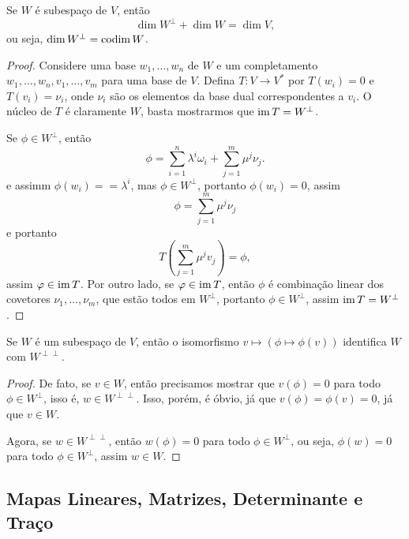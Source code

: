 \begin{proposition}
    Se $W$ é subespaço de $V$, então \begin{equation}
        \dim W^\perp + \dim W = \dim V,
    \end{equation} ou seja, $\dim W^\perp = \operatorname{codim} W$.
\end{proposition}
\begin{proof}
    Considere uma base $w_1, \dots, w_n$ de $W$ e um completamento $w_1, \dots, w_n, v_1, \dots, v_m$ para uma base de $V$. Defina $T \colon V \to V^*$ por $T(w_i) = 0$ e $T(v_i) = \nu_i$, onde $\nu_i$ são os elementos da base dual correspondentes a $v_i$. O núcleo de $T$ é claramente $W$, basta mostrarmos que $\operatorname{im} T = W^\perp$.

    Se $\phi \in W^\perp$, então \begin{equation}
        \phi = \sum_{i = 1}^n \lambda^i \omega_i + \sum_{j = 1}^m \mu^j \nu_j.
    \end{equation} e assimm $\phi(w_i) == \lambda^i$, mas $\phi \in W^\perp$, portanto $\phi(w_i) = 0$, assim \begin{equation}
        \phi = \sum_{j = 1}^m \mu^j \nu_j
    \end{equation} e portanto \begin{equation}
        T\left(\sum_{j = 1}^m \mu^j v_j\right) = \phi,
    \end{equation} assim $\varphi \in \operatorname{im} T$. Por outro lado, se $\varphi \in \operatorname{im} T$, então $\phi$ é combinação linear dos covetores $\nu_1, \dots, \nu_m$, que estão todos em $W^\perp$, portanto $\phi \in W^\perp$, assim $\operatorname{im} T = W^\perp$.
\end{proof}

\begin{proposition}
    Se $W$ é um subespaço de $V$, então o isomorfismo $v \mapsto (\phi \mapsto \phi(v))$ identifica $W$ com $W^{\perp \perp}$.
\end{proposition}
\begin{proof}
    De fato, se $v \in W$, então precisamos mostrar que $v(\phi) = 0$ para todo $\phi \in W^\perp$, isso é, $w \in W^{\perp\perp}$. Isso, porém, é óbvio, já que $v(\phi) = \phi(v) = 0$, já que $v \in W$.

    Agora, se $w \in W^{\perp\perp}$, então $w(\phi) = 0$ para todo $\phi \in W^\perp$, ou seja, $\phi(w) = 0$ para todo $\phi \in W^\perp$, assim $w \in W$.
\end{proof}

\subsection{Mapas Lineares, Matrizes, Determinante e Traço}

